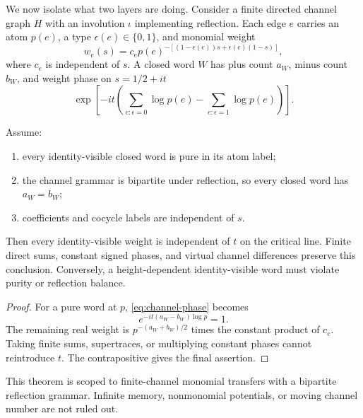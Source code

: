 We now isolate what two layers are doing.  Consider a finite directed channel
graph $H$ with an involution $\iota$ implementing reflection.  Each edge
$e$ carries an atom $p(e)$, a type $\epsilon(e)\in\{0,1\}$, and monomial
weight
\[
 w_e(s)=c_e p(e)^{-[(1-\epsilon(e))s+\epsilon(e)(1-s)]}, \tag{4.4}
\]
where $c_e$ is independent of $s$.  A closed word $W$ has plus count $a_W$,
minus count $b_W$, and weight phase on $s=1/2+it$
\[
 \exp\left[-it\left(\sum_{e:\epsilon=0}\log p(e)
 -\sum_{e:\epsilon=1}\log p(e)\right)\right]. \tag{4.5}
\]

\begin{theorem}
\label{thm:finite-channel}
Assume:
\begin{enumerate}
 \item every identity-visible closed word is pure in its atom label;
 \item the channel grammar is bipartite under reflection, so every closed
       word has $a_W=b_W$;
 \item coefficients and cocycle labels are independent of $s$.
\end{enumerate}
Then every identity-visible weight is independent of $t$ on the critical
line.  Finite direct sums, constant signed phases, and virtual channel
differences preserve this conclusion.  Conversely, a height-dependent
identity-visible word must violate purity or reflection balance.
\end{theorem}

\begin{proof}
For a pure word at $p$, \cref{eq:channel-phase} becomes
\begin{equation}
 e^{-it(a_W-b_W)\log p}=1.
 \label{eq:channel-phase}
\end{equation}
The remaining real weight is $p^{-(a_W+b_W)/2}$ times the constant product
of $c_e$.  Taking finite sums, supertraces, or multiplying constant phases
cannot reintroduce $t$.  The contrapositive gives the final assertion.
\end{proof}

This theorem is scoped to finite-channel monomial transfers with a bipartite
reflection grammar.  Infinite memory, nonmonomial potentials, or moving
channel number are not ruled out.
